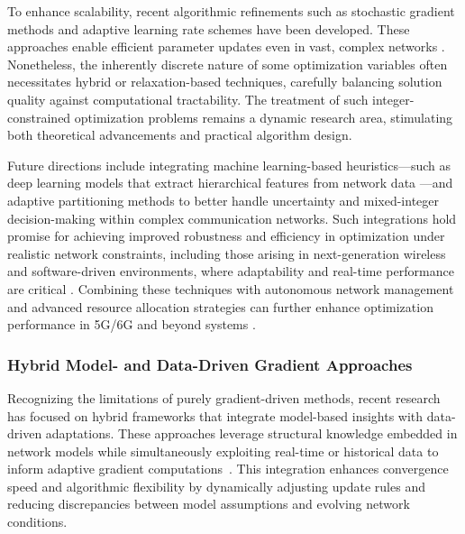\documentclass[sigconf]{acmart}
\begin{document}
To enhance scalability, recent algorithmic refinements such as stochastic gradient methods and adaptive learning rate schemes have been developed. These approaches enable efficient parameter updates even in vast, complex networks \cite{ref1,ref9,ref10,ref11,ref12,ref14,ref16}. Nonetheless, the inherently discrete nature of some optimization variables often necessitates hybrid or relaxation-based techniques, carefully balancing solution quality against computational tractability. The treatment of such integer-constrained optimization problems remains a dynamic research area, stimulating both theoretical advancements and practical algorithm design.

Future directions include integrating machine learning-based heuristics—such as deep learning models that extract hierarchical features from network data \cite{ref16}—and adaptive partitioning methods \cite{ref36} to better handle uncertainty and mixed-integer decision-making within complex communication networks. Such integrations hold promise for achieving improved robustness and efficiency in optimization under realistic network constraints, including those arising in next-generation wireless and software-driven environments, where adaptability and real-time performance are critical \cite{ref11,ref10}. Combining these techniques with autonomous network management and advanced resource allocation strategies can further enhance optimization performance in 5G/6G and beyond systems \cite{ref12,ref14}.

\subsubsection{Hybrid Model- and Data-Driven Gradient Approaches}

Recognizing the limitations of purely gradient-driven methods, recent research has focused on hybrid frameworks that integrate model-based insights with data-driven adaptations. These approaches leverage structural knowledge embedded in network models while simultaneously exploiting real-time or historical data to inform adaptive gradient computations~\cite{ref5,ref7,ref13}. This integration enhances convergence speed and algorithmic flexibility by dynamically adjusting update rules and reducing discrepancies between model assumptions and evolving network conditions.
\end{document}
